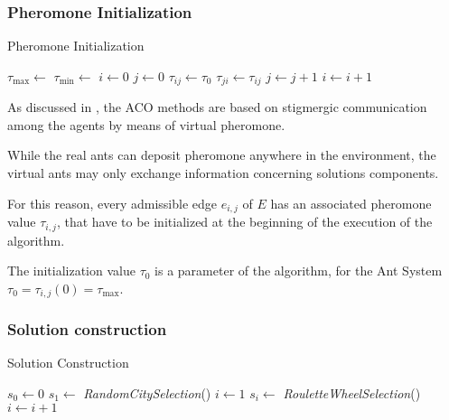 \begin{homeworkProblem}
\subsubsection{Pheromone Initialization}
\begin{algorithm}[!h]
  \caption{Pheromone Initialization}\label{init}
  \begin{algorithmic}[1]
      \State $\tau_{\max} \gets $
      \State $\tau_{\min} \gets $
      \State $i \gets 0$
      \State $j \gets 0$
          \State $\tau_{ij} \gets \tau_0$
          \State $\tau_{ji} \gets \tau_{ij}$
          \State $ j \gets j + 1$  
        \EndFor
        \State $ i \gets i + 1$ 
      \EndFor
    \EndProcedure
\end{algorithmic}
\end{algorithm}

As discussed in , the ACO methods are based on stigmergic communication among the agents by means of virtual pheromone.

While the real ants can deposit pheromone anywhere in the environment, the virtual ants may only exchange information concerning solutions components.

For this reason, every admissible edge $e_{i,j}$ of $E$ has an associated pheromone value $\tau_{i,j}$, that have to be initialized at the beginning of the execution of the algorithm.

The initialization value $\tau_0$ is a parameter of the algorithm, for the \maxmin Ant System $\tau_0 = \tau_{i,j}(0) = \tau_{\max}$. 


\subsubsection{Solution construction}
\begin{algorithm}[!h]
  \caption{Solution Construction}\label{solConstr}
  \begin{algorithmic}[1]
      \State {}
      \State $s_0 \gets 0$ 
      \State $s_1 \gets$ \emph{RandomCitySelection}() 
      \State $i \gets 1$
        \State $s_i \gets $ \emph{RouletteWheelSelection}()  
        \State $i \gets i+1$
      \EndWhile
    \EndProcedure
\end{algorithmic}
\end{algorithm}


\end{homeworkProblem}
